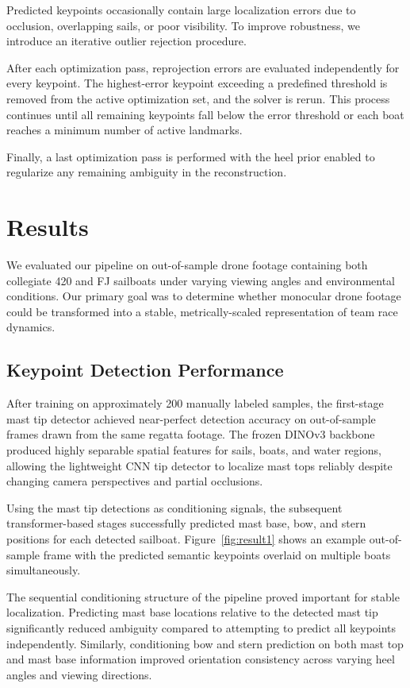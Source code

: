 Predicted keypoints occasionally contain large localization errors due to occlusion, overlapping sails, or poor visibility. To improve robustness, we introduce an iterative outlier rejection procedure.

After each optimization pass, reprojection errors are evaluated independently for every keypoint. The highest-error keypoint exceeding a predefined threshold is removed from the active optimization set, and the solver is rerun. This process continues until all remaining keypoints fall below the error threshold or each boat reaches a minimum number of active landmarks.

Finally, a last optimization pass is performed with the heel prior enabled to regularize any remaining ambiguity in the reconstruction.

\section{Results}

We evaluated our pipeline on out-of-sample drone footage containing both collegiate 420 and FJ sailboats under varying viewing angles and environmental conditions. Our primary goal was to determine whether monocular drone footage could be transformed into a stable, metrically-scaled representation of team race dynamics.

\subsection{Keypoint Detection Performance}

After training on approximately 200 manually labeled samples, the first-stage mast tip detector achieved near-perfect detection accuracy on out-of-sample frames drawn from the same regatta footage. The frozen DINOv3 backbone produced highly separable spatial features for sails, boats, and water regions, allowing the lightweight CNN tip detector to localize mast tops reliably despite changing camera perspectives and partial occlusions.

Using the mast tip detections as conditioning signals, the subsequent transformer-based stages successfully predicted mast base, bow, and stern positions for each detected sailboat. Figure~\ref{fig:result1} shows an example out-of-sample frame with the predicted semantic keypoints overlaid on multiple boats simultaneously.

The sequential conditioning structure of the pipeline proved important for stable localization. Predicting mast base locations relative to the detected mast tip significantly reduced ambiguity compared to attempting to predict all keypoints independently. Similarly, conditioning bow and stern prediction on both mast top and mast base information improved orientation consistency across varying heel angles and viewing directions.

